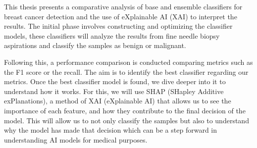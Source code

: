 This thesis presents a comparative analysis of base and ensemble classifiers for breast cancer detection and the use of eXplainable AI (XAI) to interpret the results. The initial phase involves constructing and optimizing the classifier models, these classifiers will analyze the results from fine needle biopsy aspirations and classify the samples as benign or malignant.

Following this, a performance comparison is conducted comparing metrics such as the F1 score or the recall. The aim is to identify the best classifier regarding our metrics. Once the best classifier model is found, we dive deeper into it to understand how it works. For this, we will use SHAP (SHapley Additive exPlanations), a method of XAI (eXplainable AI) that allows us to see the importance of each feature, and how they contribute to the final decision of the model. This will allow us to not only classify the samples but also to understand why the model has made that decision which can be a step forward in understanding AI models for medical purposes.


